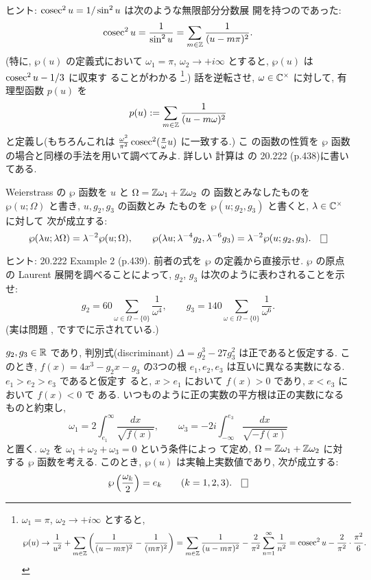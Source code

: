 \documentclass[12pt,twoside]{jarticle}
\def\setminus{-}
\def\pe{\wp}
\def\cosec{\mathop{\mbox{\rm cosec}}\nolimits}
\def\Z{{\Bbb Z}} %
\def\R{{\Bbb R}} %
\def\C{{\Bbb C}} %
\begin{document}
\noindent ヒント: $\cosec^2 u = 1/\sin^2 u$ は次のような無限部分分数展
開を持つのであった:
\[
  \cosec^2 u = \frac{1}{\sin^2 u}
  = \sum_{m\in\Z}\frac{1}{(u-m\pi)^2}.
\]
(特に, $\pe(u)$ の定義式において $\omega_1=\pi$, %
$\omega_2\to +i\infty$ とすると, $\pe(u)$ は $\cosec^2 u-1/3$ に収束す
ることがわかる%
\footnote{$\omega_1=\pi$, $\omega_2\to+i\infty$ とすると,
  \[
    \pe(u)
    \to
    \frac{1}{u^2}
    +
    \sum_{m\in\Z}
    \left( \frac{1}{(u-m\pi)^2} - \frac{1}{(m\pi)^2} \right)
    =
    \sum_{m\in\Z}\frac{1}{(u-m\pi)^2}
    -
    \frac{2}{\pi^2} \sum_{n=1}^\infty \frac{1}{n^2}
    =
    \cosec^2 u
    -
    \frac{2}{\pi^2}\cdot\frac{\pi^2}{6}.
  \]}.) %
話を逆転させ, $\omega\in\C^{\times}$ に対して, 有理型函数 $p(u)$ を
\[
  p(u) := \sum_{m\in\Z}\frac{1}{(u-m\omega)^2}
\] %
と定義し(もちろんこれは %
$\frac{\omega^2}{\pi^2}\cosec^2(\frac{\pi}{\omega}u)$ に一致する.) こ
の函数の性質を $\pe$ 函数の場合と同様の手法を用いて調べてみよ. 詳しい
計算は \cite{WW}の 20.222 (p.438)に書いてある.

\begin{question}
  Weierstrass の $\pe$ 函数を $u$ と $\Omega=\Z\omega_1+\Z\omega_2$ の
  函数とみなしたものを $\pe(u;\Omega)$ と書き, $u,g_2,g_3$ の函数とみ
  たものを $\pe(u;g_2,g_3)$ と書くと, $\lambda\in\C^{\times}$ に対して
  次が成立する:
  \[
    \pe(\lambda u;\lambda\Omega)
    = \lambda^{-2} \pe(u;\Omega),
    \qquad
    \pe(\lambda u;\lambda^{-4} g_2, \lambda^{-6} g_3)
    = \lambda^{-2} \pe(u;g_2,g_3).
  \qed
  \]
\end{question}

\noindent ヒント: \cite{WW} 20.222 Example 2 (p.439). 前者の式を $\pe$
の定義から直接示せ. $\pe$ の原点の Laurent 展開を調べることによって, %
$g_2$, $g_3$ は次のように表わされることを示せ:
\[
  g_2 = 
  60 \sum_{\omega\in\Omega\setminus\{0\}} \frac{1}{\omega^4},
  \qquad
  g_3 = 
  140 \sum_{\omega\in\Omega\setminus\{0\}} \frac{1}{\omega^6}.
\]
(実は問題 , ですでに示されている.)

\begin{question}
  $g_2,g_3\in\R$ であり, 判別式(discriminant) $\Delta=g_2^3-27g_3^2$ %
  は正であると仮定する. このとき, $f(x)=4x^3 - g_2x -g_3$ の3つの根 %
  $e_1,e_2,e_3$ は互いに異なる実数になる. $e_1>e_2>e_3$ であると仮定す
  ると, $x>e_1$ において $f(x)>0$ であり, $x<e_3$ において $f(x)<0$ で
  ある. いつものように正の実数の平方根は正の実数になるものと約束し,
  \[
    \omega_1 = 2 \int_{e_1}^\infty \frac{dx}{\sqrt{f(x)}},
    \qquad
    \omega_3 = - 2i \int_{-\infty}^{e_3} \frac{dx}{\sqrt{-f(x)}}
  \] %
  と置く. $\omega_2$ を $\omega_1+\omega_2+\omega_3=0$ という条件によっ
  て定め, $\Omega=\Z\omega_1+\Z\omega_2$ に対する $\pe$ 函数を考える.
  このとき, $\pe(u)$ は実軸上実数値であり, 次が成立する:
  \[
    \pe\left(\frac{\omega_k}{2}\right) = e_k
    \qquad
    (k=1,2,3).
  \qed
  \]
\end{question}
\end{document}
